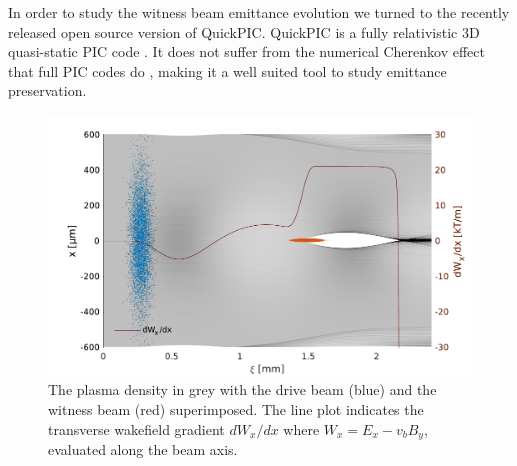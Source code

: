 \documentclass[aps,prstab,reprint,amsmath,amssymb,groupedaddress]{revtex4-1}
\begin{document}
In order to study the witness beam emittance evolution we turned to the recently released open source version of
QuickPIC. QuickPIC is a fully relativistic 3D quasi-static PIC code \cite{huang:2006, an:2013}. It does not suffer from
the numerical Cherenkov effect that full PIC codes do \cite{godfrey:1974,lehe:2013}, making it a well suited tool to
study emittance preservation.


\begin{figure}[hbt]
    \includegraphics[width=\linewidth,trim={2mm 0mm 2mm 0mm},clip]{figures/plasmaDenTWake}
    \caption{\label{Fig:PlasmaDenTWake} The plasma density in grey with the drive beam (blue) and the witness beam (red)
        superimposed. The line plot indicates the transverse wakefield gradient $dW_{x}/dx$ where
        $W_{x} = E_{x} - v_{b} B_{y}$, evaluated along the beam axis.}
\end{figure}

\end{document}
